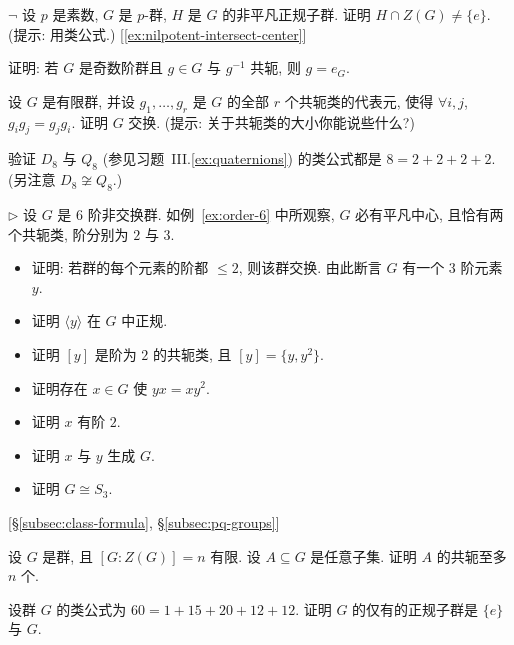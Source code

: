 \begin{prob}
\label{ex:normal-intersects-center}
$\neg$ 设 $p$ 是素数, $G$ 是 $p$-群, $H$ 是 $G$ 的非平凡正规子群. 证明 $H \cap Z(G) \neq \{e\}$. (提示: 用类公式.) [\ref{ex:nilpotent-intersect-center}]
\end{prob}

\begin{prob}
\label{ex:odd-conjugate}
证明: 若 $G$ 是奇数阶群且 $g \in G$ 与 $g^{-1}$ 共轭, 则 $g = e_G$.
\end{prob}

\begin{prob}
\label{ex:commuting-representatives}
设 $G$ 是有限群, 并设 $g_1,\ldots,g_r$ 是 $G$ 的全部 $r$ 个共轭类的代表元, 使得 $\forall i, j$, $g_ig_j = g_jg_i$. 证明 $G$ 交换. (提示: 关于共轭类的大小你能说些什么?)
\end{prob}

\begin{prob}
\label{ex:class-formula-d8-q8}
验证 $D_8$ 与 $Q_8$ (参见习题~III.\ref{ex:quaternions}) 的类公式都是 $8 = 2 + 2 + 2 + 2$. (另注意 $D_8 \not\cong Q_8$.)
\end{prob}

\begin{prob}
\label{ex:order-6-S3}
$\triangleright$ 设 $G$ 是 $6$ 阶非交换群. 如例~\ref{ex:order-6} 中所观察, $G$ 必有平凡中心, 且恰有两个共轭类, 阶分别为 $2$ 与 $3$.
\begin{itemize}
	\item 证明: 若群的每个元素的阶都 $\leq 2$, 则该群交换. 由此断言 $G$ 有一个 $3$ 阶元素 $y$.
	\item 证明 $\langle y \rangle$ 在 $G$ 中正规.
	\item 证明 $[y]$ 是阶为 $2$ 的共轭类, 且 $[y] = \{y, y^2\}$.
	\item 证明存在 $x \in G$ 使 $yx = xy^2$.
	\item 证明 $x$ 有阶 $2$.
	\item 证明 $x$ 与 $y$ 生成 $G$.
	\item 证明 $G \cong S_3$.
\end{itemize}
[\S\ref{subsec:class-formula}, \S\ref{subsec:pq-groups}]
\end{prob}

\begin{prob}
\label{ex:conjugates-bound}
设 $G$ 是群, 且 $[G:Z(G)] = n$ 有限. 设 $A \subseteq G$ 是任意子集. 证明 $A$ 的共轭至多 $n$ 个.
\end{prob}

\begin{prob}
\label{ex:class-formula-60}
设群 $G$ 的类公式为 $60 = 1 + 15 + 20 + 12 + 12$. 证明 $G$ 的仅有的正规子群是 $\{e\}$ 与 $G$.
\end{prob}

